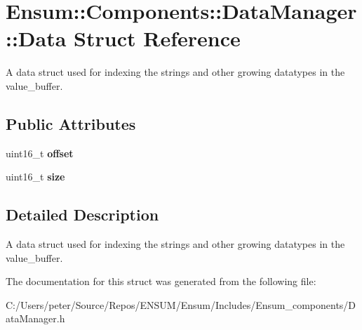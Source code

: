 \hypertarget{struct_ensum_1_1_components_1_1_data_manager_1_1_data}{}\section{Ensum\+:\+:Components\+:\+:Data\+Manager\+:\+:Data Struct Reference}
\label{struct_ensum_1_1_components_1_1_data_manager_1_1_data}


A data struct used for indexing the strings and other growing datatypes in the value\+\_\+buffer.  


\subsection*{Public Attributes}
\begin{DoxyCompactItemize}
\item 
uint16\+\_\+t {\bfseries offset}\hypertarget{struct_ensum_1_1_components_1_1_data_manager_1_1_data_a3d8c75f03b155ea6f50119251bc2eed4}{}\label{struct_ensum_1_1_components_1_1_data_manager_1_1_data_a3d8c75f03b155ea6f50119251bc2eed4}

\item 
uint16\+\_\+t {\bfseries size}\hypertarget{struct_ensum_1_1_components_1_1_data_manager_1_1_data_aaa33fb8a50b46948fc1c9c8473a45e29}{}\label{struct_ensum_1_1_components_1_1_data_manager_1_1_data_aaa33fb8a50b46948fc1c9c8473a45e29}

\end{DoxyCompactItemize}


\subsection{Detailed Description}
A data struct used for indexing the strings and other growing datatypes in the value\+\_\+buffer. 

The documentation for this struct was generated from the following file\+:\begin{DoxyCompactItemize}
\item 
C\+:/\+Users/peter/\+Source/\+Repos/\+E\+N\+S\+U\+M/\+Ensum/\+Includes/\+Ensum\+\_\+components/Data\+Manager.\+h\end{DoxyCompactItemize}
